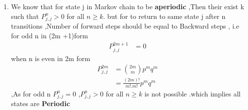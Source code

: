 \begin{enumerate}
    \item We know that for state j in Markov chain to be \textbf{aperiodic} ,Then their  exist k such that $P_{j,j}^{n} > 0$ for all $n \geq k$. but for to return to same state j after n transitions  ,Number of forward steps should be equal to Backward steps , i.e for odd n in (2m +1)form
    \begin{align}
        P_{j,j}^{2m+1}&=0  
        \label{2019/105/eq:eq1}
    \end{align}
    when n is even in 2m form
    \begin{align}
        P_{j,j}^{2m}&=\binom{2m}{m}p^{m}q^{m}
     \\
     &=\frac{(2m)!}{m!.m!}p^{m}q^{m}
     \label{2019/105/eq:eq2}
    \end{align}
    ,As for odd n $P_{j,j}^{n} = 0$ ,$P_{j,j}^{n} > 0$ for all $n \geq k$ is not possible .which implies  all states are \textbf{Periodic}
  

\end{enumerate}
